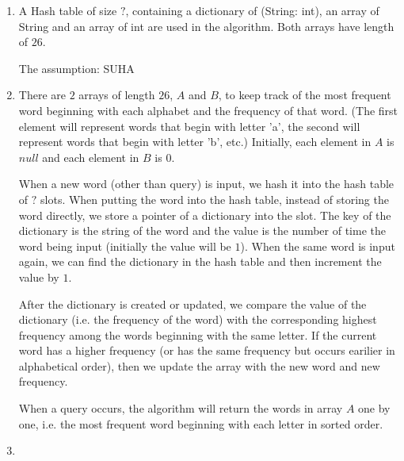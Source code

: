 \documentclass[11pt, answers]{exam}
\theoremstyle{plain}
\theoremstyle{definition}
\begin{document}
\begin{questions}
\begin{solution}
\begin{parts}
\end{parts}
\end{solution}


\question
\begin{solution}
\begin{enumerate}
\item A Hash table of size $?$, containing a dictionary of (String: int), an array of String and an array of int are used in the algorithm. Both arrays have length of $26$.

The assumption: SUHA%

\item There are $2$ arrays of length $26$, $A$ and $B$, to keep track of the most frequent word beginning with each alphabet and the frequency of that word. (The first element will represent words that begin with letter 'a', the second will represent words that begin with letter 'b', etc.) Initially, each element in $A$ is $null$ and each element in $B$ is $0$. 

When a new word (other than query) is input, we hash it into the hash table of $?$ slots. When putting the word into the hash table, instead of storing the word directly, we store a pointer of a dictionary into the slot. The key of the dictionary is the string of the word and the value is the number of time the word being input (initially the value will be $1$). When the same word is input again, we can find the dictionary in the hash table and then increment the value by $1$. 

After the dictionary is created or updated, we compare the value of the dictionary (i.e. the frequency of the word) with the corresponding highest frequency among the words beginning with the same letter. If the current word has a higher frequency (or has the same frequency but occurs earilier in alphabetical order), then we update the array with the new word and new frequency. 

When a query occurs, the algorithm will return the words in array $A$ one by one, i.e. the most frequent word beginning with each letter in sorted order.

\item 
\end{enumerate}
\end{solution}

\end{questions}
\end{document}

